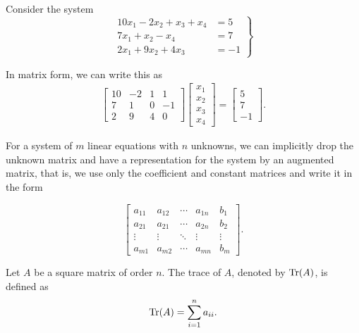     \begin{example}
        Consider the system
        \[\left.\begin{aligned}
            10x_1 - 2x_2 + x_3 + x_4 &= 5 \\
            7x_1 + x_2 - x_4 &= 7 \\
            2x_1 + 9x_2 + 4x_3 &= -1
        \end{aligned}\right\}\]
    \end{example}
    In matrix form, we can write this as
    \begin{align*}
        \begin{bmatrix}
            10 & -2 & 1 & 1 \\
            7 & 1 & 0 & -1 \\
            2 & 9 & 4 & 0 
        \end{bmatrix}\begin{bmatrix}
            x_1 \\ x_2 \\ x_3 \\ x_4
        \end{bmatrix} = \begin{bmatrix}
            5 \\ 7 \\ -1
        \end{bmatrix}.
    \end{align*}

    \begin{dfn}
        For a system of \(m\) linear equations with \(n\) unknowns, we can implicitly drop the unknown matrix and have a representation for the system by an augmented matrix, that is, we use only the coefficient and constant matrices and write it in the form

        \[\left[\begin{array}{cccc|c}
            a_{11} & a_{12} & \cdots & a_{1n} & b_1 \\
            a_{21} & a_{21} & \cdots & a_{2n} & b_2 \\
            \vdots & \vdots & \ddots & \vdots & \vdots \\
            a_{m1} & a_{m2} & \cdots & a_{mn} & b_{m}
        \end{array}\right].\]
    \end{dfn}

    \begin{dfn}[Trace]
        Let \(A\) be a square matrix of order \(n\). The trace of \(A\), denoted by \(\operatorname{Tr}(A)\), is defined as \[\operatorname{Tr}(A) = \sum_{i = 1}^n a_{ii}.\]
    \end{dfn}

